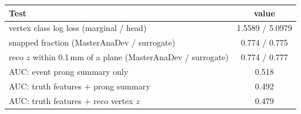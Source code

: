 \begin{tabular}{lc}
\toprule
Test & value \\
\midrule
vertex class log loss (marginal / head) & 1.5589 / 5.0979 \\
snapped fraction (MasterAnaDev / surrogate) & 0.774 / 0.775 \\
reco $z$ within 0.1\,mm of a plane (MasterAnaDev / surrogate) & 0.774 / 0.777 \\
\midrule
AUC: event prong summary only & 0.518 \\
AUC: truth features + prong summary & 0.492 \\
AUC: truth features + reco vertex $z$ & 0.479 \\
\bottomrule
\end{tabular}
